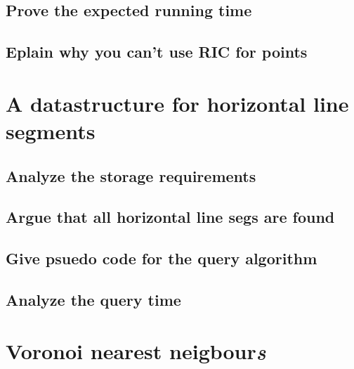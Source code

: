 \documentclass{article}
\begin{document}
\subsection{Prove the expected running time}
\subsection{Eplain why you can't use RIC for points}
\section{A datastructure for horizontal line segments}
\subsection{Analyze the storage requirements}
\subsection{Argue that all horizontal line segs are found}
\subsection{Give psuedo code for the query algorithm}
\subsection{Analyze the query time}
\section{Voronoi nearest neigbour\emph{s}}
\end{document}
